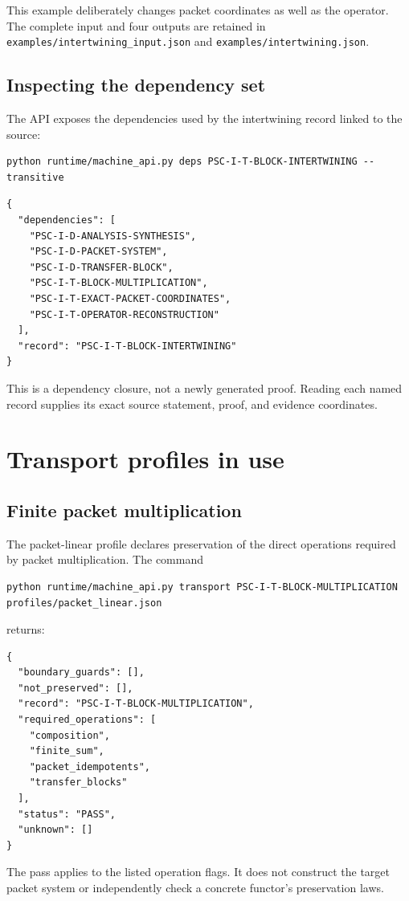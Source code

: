\documentclass[a4paper,11pt]{article}
\begin{document}
This example deliberately changes packet coordinates as well as the operator. The complete input and four outputs are retained in \nolinkurl{examples/intertwining_input.json} and \nolinkurl{examples/intertwining.json}.
\subsection{Inspecting the dependency set}
The API exposes the dependencies used by the intertwining record linked to the source:
\begin{lstlisting}
python runtime/machine_api.py deps PSC-I-T-BLOCK-INTERTWINING --transitive
\end{lstlisting}

\begin{lstlisting}
{
  "dependencies": [
    "PSC-I-D-ANALYSIS-SYNTHESIS",
    "PSC-I-D-PACKET-SYSTEM",
    "PSC-I-D-TRANSFER-BLOCK",
    "PSC-I-T-BLOCK-MULTIPLICATION",
    "PSC-I-T-EXACT-PACKET-COORDINATES",
    "PSC-I-T-OPERATOR-RECONSTRUCTION"
  ],
  "record": "PSC-I-T-BLOCK-INTERTWINING"
}
\end{lstlisting}

This is a dependency closure, not a newly generated proof. Reading each named record supplies its exact source statement, proof, and evidence coordinates.

\section{Transport profiles in use}
\subsection{Finite packet multiplication}
The packet-linear profile declares preservation of the direct operations required by packet multiplication. The command
\begin{lstlisting}
python runtime/machine_api.py transport PSC-I-T-BLOCK-MULTIPLICATION profiles/packet_linear.json
\end{lstlisting}
returns:

\begin{lstlisting}
{
  "boundary_guards": [],
  "not_preserved": [],
  "record": "PSC-I-T-BLOCK-MULTIPLICATION",
  "required_operations": [
    "composition",
    "finite_sum",
    "packet_idempotents",
    "transfer_blocks"
  ],
  "status": "PASS",
  "unknown": []
}
\end{lstlisting}

The pass applies to the listed operation flags. It does not construct the target packet system or independently check a concrete functor's preservation laws.
\end{document}
